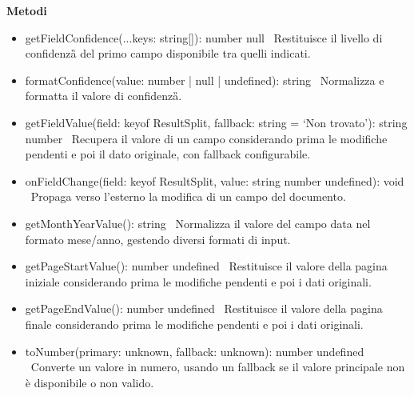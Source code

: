 \documentclass[a4paper,11pt]{article}
\begin{document}
\textbf{Metodi}

\begin{itemize}
\item getFieldConfidence(...keys: string[]): number \textbar{} null \
Restituisce il livello di confidenza\G{} del primo campo disponibile tra quelli indicati.

\item formatConfidence(value: number | null | undefined): string \
Normalizza e formatta il valore di confidenza\G{}.
\item getFieldValue(field: keyof ResultSplit, fallback: string = `Non trovato'): string \textbar{} number \
Recupera il valore di un campo considerando prima le modifiche pendenti e poi il dato originale, con fallback configurabile.

\item onFieldChange(field: keyof ResultSplit, value: string \textbar{} number \textbar{} undefined): void \
Propaga verso l'esterno la modifica di un campo del documento.

\item getMonthYearValue(): string \
Normalizza il valore del campo data nel formato mese/anno, gestendo diversi formati di input.

\item getPageStartValue(): number \textbar{} undefined \
Restituisce il valore della pagina iniziale considerando prima le modifiche pendenti e poi i dati originali.

\item getPageEndValue(): number \textbar{} undefined \
Restituisce il valore della pagina finale considerando prima le modifiche pendenti e poi i dati originali.

\item toNumber(primary: unknown, fallback: unknown): number \textbar{} undefined \
Converte un valore in numero, usando un fallback se il valore principale non è disponibile o non valido.
\end{itemize}
\end{document}
